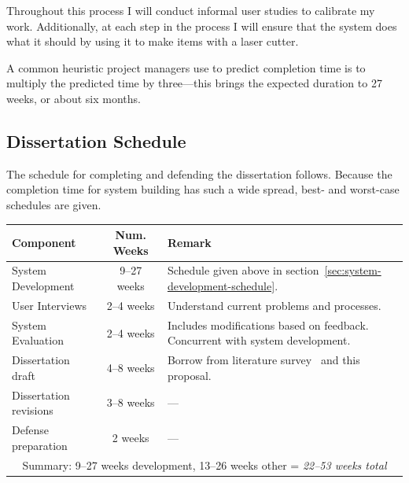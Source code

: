 \documentclass[11pt]{article}
\begin{document}
Throughout this process I will conduct informal user studies to
calibrate my work. Additionally, at each step in the process I will
ensure that the system does what it should by using it to make items
with a laser cutter. 

A common heuristic project managers use to predict completion time is
to multiply the predicted time by three---this brings the expected
duration to 27 weeks, or about six months.

\subsection{Dissertation Schedule}

The schedule for completing and defending the dissertation
follows. Because the completion time for system building has such a
wide spread, best- and worst-case schedules are given.

\vspace{12pt}
\begin{tabular}{ | l | c | p{80mm} | }
  \hline

  \textbf{Component} & \textbf{Num. Weeks} & \textbf{Remark} \\

  \hline \hline

  System Development & 9--27 weeks & Schedule given above in
  section~\ref{sec:system-development-schedule}. \\

  User Interviews & 2--4 weeks & Understand current problems and
  processes. \\

  System Evaluation & 2--4 weeks & Includes modifications based on
  feedback. Concurrent with system development. \\ 

  Dissertation draft & 4--8 weeks & Borrow from literature
  survey~\cite{johnson-sketch-review} and this proposal. \\

  Dissertation revisions & 3--8 weeks & ---\\

  Defense preparation & 2 weeks & ---\\

  \hline

  \multicolumn{3}{|c|}{
    Summary: 9--27 weeks development, 13--26 weeks other = 
    \textit{22--53 weeks total}
  } \\

  \hline

\end{tabular}

\singlespacing\newpage



\end{document}
